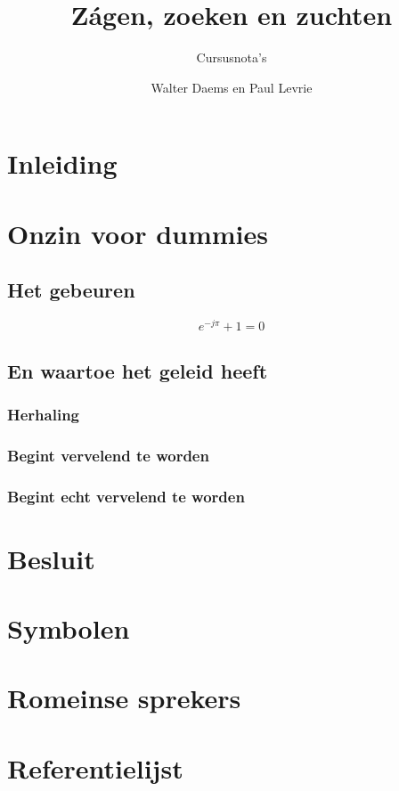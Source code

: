 \documentclass[ti,a4paper,11pt,oneside,openright,cameraready,filled]{uantwerpencoursetext}
\title{Z\'agen, zoeken en zuchten}
\subtitle{Cursusnota's}
\author{Walter Daems en Paul Levrie}
\begin{document}
\maketitle

\frontmatter

\tableofcontents

\mainmatter
\chapter*{Inleiding}

\kant[1]
\chapter{Onzin voor dummies}

\section{Het gebeuren}
\kant[2]
\begin{equation}
  e^{-j\pi} + 1 = 0
\end{equation}

\kant[3]
\section{En waartoe het geleid heeft}

\kant[4]

\subsection{Herhaling}

\kant[5]

\subsection{Begint vervelend te worden}

\kant[6]
\newpage

\subsection{Begint echt vervelend te worden}

\kant[7-10]

\chapter{Besluit}

\appendix

\chapter{Symbolen}
\chapter{Romeinse sprekers}
\chapter{Referentielijst}

\makefinalpage
\end{document}
